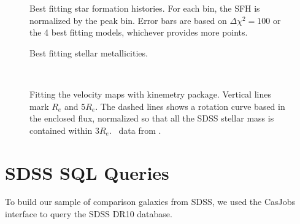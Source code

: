 \documentclass{emulateapj}
\newcommand\HI{\ion{H}{1}}
\begin{document}

\begin{figure}
\caption{ Best fitting star formation histories.  For each bin, the SFH is normalized by the peak bin.  Error bars are based on $\Delta\chi^2=100$ or the 4 best fitting models, whichever provides more points.  \label{sfh_ugc} }
\end{figure}


\begin{figure}
\caption{Best fitting stellar metallicities.   \label{metal_ugc}}
\end{figure}


\begin{figure*}
 \\
\caption{Fitting the velocity maps with kinemetry package. Vertical lines mark $R_e$ and $5R_e$.  The dashed lines shows a rotation curve based in the enclosed flux, normalized so that all the SDSS stellar mass is contained within $3R_e$.  \HI\ data from \citet{Pickering97}.\label{ugc_kinem}}
\end{figure*}




\clearpage

\appendix
\section{SDSS SQL Queries} \label{SQL}
To build our sample of comparison galaxies from SDSS, we used the CasJobs interface to query the SDSS DR10 database.
\end{document}
